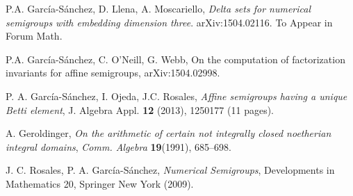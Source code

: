 \documentclass[11pt]{amsart}
\theoremstyle{remark}
\begin{document}
\begin{thebibliography}{99}
 P.A. Garc\'ia-S\'anchez, D. Llena, A. Moscariello, \textit{Delta sets for numerical semigroups with embedding dimension three}. arXiv:1504.02116. To Appear in Forum Math.

 P.A. Garc\'ia-S\'anchez, C. O'Neill, G. Webb, On the computation of factorization invariants for affine semigroups, arXiv:1504.02998.

  P. A. Garc\'ia-S\'anchez, I. Ojeda, J.C. Rosales, \textit{Affine semigroups having a unique Betti element}, J. Algebra Appl. \textbf{12} (2013), 1250177 (11 pages).

 A. Geroldinger, \emph {On the arithmetic of certain not integrally closed noetherian integral domains},
\textit{Comm. Algebra} \textbf{19}(1991), 685--698.

%
%
%

 J. C. Rosales, P. A. Garc\'ia-S\'anchez, \textit
{Numerical Semigroups}, Developments in Mathematics 20, Springer New York (2009).
\end{thebibliography}
\end{document}
